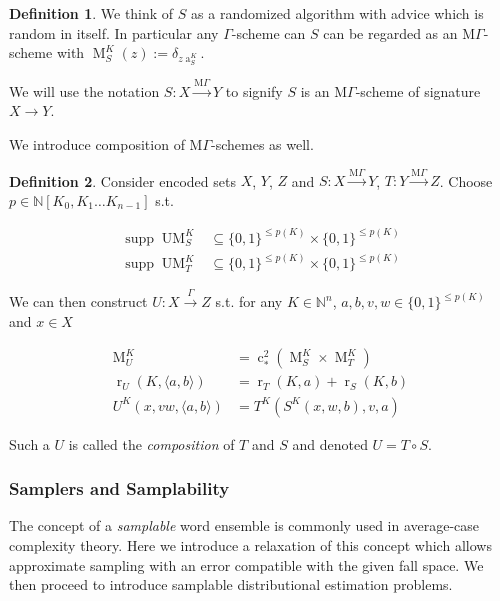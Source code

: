 \documentclass{article}
\numberwithin{equation}{section}
\theoremstyle{definition}
\newtheorem{definition}{Definition}[section]
\theoremstyle{plain}
\newcommand{\Bool}{\{0,1\}}
\DeclareMathOperator{\Supp}{supp}
\DeclareMathOperator{\R}{r}
\DeclareMathOperator{\A}{a}
\DeclareMathOperator{\M}{M}
\DeclareMathOperator{\UM}{UM}
\DeclareMathOperator{\En}{c}
\newcommand{\Nats}{\mathbb{N}}
\newcommand{\NatPoly}{\Nats[K_0, K_1 \ldots K_{n-1}]}
\newcommand{\Chev}[1]{\langle #1 \rangle}
\newcommand{\MGrow}{\mathrm{M}\Gamma}
\newcommand{\Scheme}{\xrightarrow{\Gamma}}
\newcommand{\MScheme}{\xrightarrow{\MGrow}}
\begin{document}
\begin{samepage}
\begin{definition}
We think of $S$ as a randomized algorithm with advice which is random in itself. In particular any $\Gamma$-scheme can $S$ can be regarded as an $\MGrow$-scheme with $\M_S^K(z):=\delta_{z\A_S^K}$.

We will use the notation $S: X \MScheme Y$ to signify $S$ is an $\MGrow$-scheme of signature $X \rightarrow Y$.

\end{definition}
\end{samepage}

We introduce composition of ${\MGrow}$-schemes as well.

\begin{samepage}
\begin{definition}

Consider encoded sets $X$, $Y$, $Z$ and $S: X \MScheme Y$, $T: Y \MScheme Z$. Choose\\ ${p \in \NatPoly}$ s.t. 

\begin{align*}
\Supp \UM_S^K &\subseteq \Bool^{\leq p(K)} \times \Bool^{\leq p(K)} \\
\Supp \UM_T^K &\subseteq \Bool^{\leq p(K)} \times \Bool^{\leq p(K)}
\end{align*}

We can then construct $U: X \Scheme Z$ s.t. for any $K \in \Nats^n$, $a,b,v,w \in \Bool^{\leq p(K)}$ and $x \in X$

\begin{align}
\M_U^K &= \En_*^2(\M_S^K \times \M_T^K) \\
\R_U(K, \Chev{a,b}) &= \R_T(K,a)+\R_S(K,b) \\
U^K(x,vw,\Chev{a,b}) &= T^K(S^K(x,w,b),v,a)
\end{align}

Such a $U$ is called the \emph{composition} of $T$ and $S$ and denoted $U = T \circ S$.

\end{definition}
\end{samepage}

\subsubsection{Samplers and Samplability}

The concept of a \emph{samplable} word ensemble is commonly used in average-case complexity theory. Here we introduce a relaxation of this concept which allows approximate sampling with an error compatible with the given fall space. We then proceed to introduce samplable distributional estimation problems.
\end{document}
